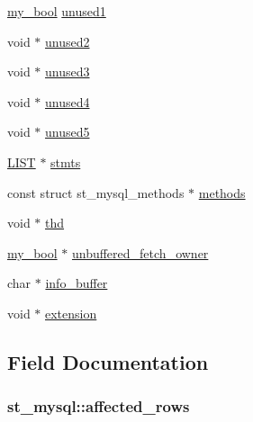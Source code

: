 \begin{DoxyCompactItemize}
\item 
\hyperlink{mysql_8h_a74cd599039dcf29c6e6d342cf4efd0a8}{my\+\_\+bool} \hyperlink{structst__mysql_aa9656f1c38e91c63a2c7b86144e9e675}{unused1}
\item 
void $\ast$ \hyperlink{structst__mysql_ae0451f85e4dcfd3acf69235f20febc75}{unused2}
\item 
void $\ast$ \hyperlink{structst__mysql_abbe6315ea3e9df0e9e1d93708e31da56}{unused3}
\item 
void $\ast$ \hyperlink{structst__mysql_a2887d342b67605530757845522c307be}{unused4}
\item 
void $\ast$ \hyperlink{structst__mysql_af3adab90c86872eff4b923469b459749}{unused5}
\item 
\hyperlink{my__list_8h_ab2a1c5fd766481fe9ec169b9fdca184e}{L\+I\+S\+T} $\ast$ \hyperlink{structst__mysql_afe0722884084a6d3a8b9448e71ca25e2}{stmts}
\item 
const struct st\+\_\+mysql\+\_\+methods $\ast$ \hyperlink{structst__mysql_a04129bc0cbeda076db8ba274ed93328d}{methods}
\item 
void $\ast$ \hyperlink{structst__mysql_af7c6f25aed31575514966a3cdf77ebc6}{thd}
\item 
\hyperlink{mysql_8h_a74cd599039dcf29c6e6d342cf4efd0a8}{my\+\_\+bool} $\ast$ \hyperlink{structst__mysql_a7245af2550c3858f3e2e22c55538f7e1}{unbuffered\+\_\+fetch\+\_\+owner}
\item 
char $\ast$ \hyperlink{structst__mysql_a135e9fa0dea39f54be633acd845634a4}{info\+\_\+buffer}
\item 
void $\ast$ \hyperlink{structst__mysql_a544142924a78d2fb3f7bbda547fc5a14}{extension}
\end{DoxyCompactItemize}


\subsection{Field Documentation}
\hypertarget{structst__mysql_acf6930c0bcb39cc19665b1a4142ba559}{}
\subsubsection[{affected\+\_\+rows}]{ st\+\_\+mysql\+::affected\+\_\+rows}\label{structst__mysql_acf6930c0bcb39cc19665b1a4142ba559}
\hypertarget{structst__mysql_a5d128ecd21c6265f37c283824b3ad813}{}
